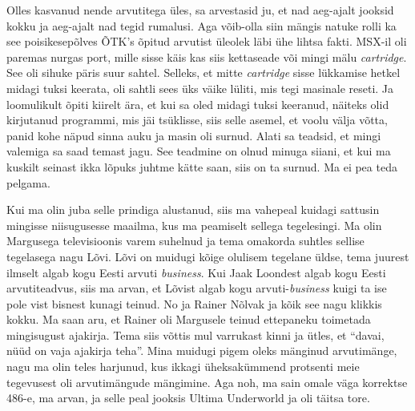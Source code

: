 Olles kasvanud nende arvutitega üles, sa arvestasid ju, et nad aeg-ajalt 
jooksid kokku ja aeg-ajalt nad tegid rumalusi. Aga võib-olla siin mängis natuke 
rolli ka see  poisikesepõlves ÕTK's õpitud arvutist üleolek läbi ühe lihtsa fakti. 
MSX-il oli paremas nurgas port, mille sisse käis kas 
siis kettaseade või mingi mälu \emph{cartridge}. See oli sihuke päris suur 
sahtel. Selleks, et mitte \emph{cartridge} sisse lükkamise hetkel midagi tuksi 
keerata, oli sahtli sees üks väike lüliti, mis tegi masinale reseti. Ja 
loomulikult õpiti kiirelt ära, et kui sa oled midagi tuksi keeranud, näiteks 
olid kirjutanud programmi, mis jäi tsüklisse, siis selle asemel, et voolu välja 
võtta, panid kohe näpud sinna auku ja masin oli surnud. Alati sa teadsid, et 
mingi valemiga sa saad temast jagu. See teadmine on olnud minuga siiani, et kui 
ma kuskilt seinast ikka lõpuks juhtme kätte saan, siis on ta surnud. Ma ei pea 
teda pelgama.


Kui ma olin juba selle prindiga alustanud, siis ma vahepeal kuidagi sattusin 
mingisse niisugusesse maailma, kus ma peamiselt sellega tegelesingi. Ma olin 
Margusega televisioonis varem suhelnud ja tema omakorda suhtles 
sellise tegelasega nagu Lõvi. Lõvi on muidugi kõige olulisem 
tegelane üldse, tema juurest ilmselt algab kogu Eesti arvuti \emph{business}. 
Kui Jaak Loondest algab kogu Eesti arvutiteadvus, siis 
ma arvan, et Lõvist algab kogu arvuti-\emph{business} kuigi ta ise pole vist 
bisnest kunagi teinud. No ja Rainer Nõlvak ja kõik 
see nagu klikkis kokku. Ma saan aru, et Rainer oli Margusele teinud ettepaneku 
toimetada mingisugust ajakirja. Tema siis võttis mul varrukast kinni ja ütles, 
et \enquote{davai, nüüd on vaja ajakirja teha}. Mina muidugi pigem oleks 
mänginud arvutimänge, nagu ma olin teles harjunud, kus ikkagi üheksakümmend 
protsenti meie tegevusest oli arvutimängude mängimine. Aga noh, ma sain omale 
väga korrektse 486-e, ma arvan, ja selle peal jooksis Ultima 
Underworld ja oli täitsa tore. 


